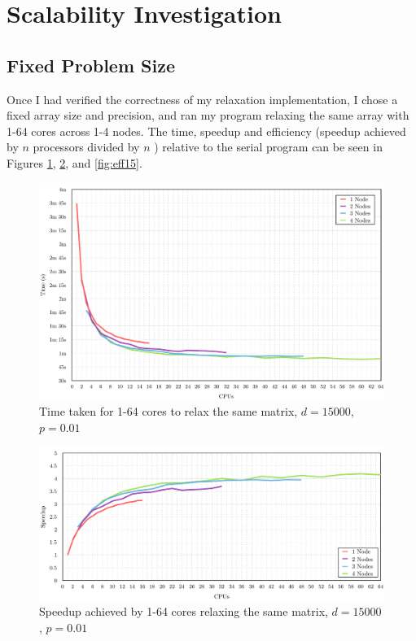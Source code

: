 \documentclass[12pt]{article}
\begin{document}
\section{Scalability Investigation}

\subsection{Fixed Problem Size}
Once I had verified the correctness of my relaxation implementation, I chose a fixed array size and precision, and ran my program relaxing the same array with 1-64 cores across 1-4 nodes.  The time, speedup and efficiency (speedup achieved by $n$ processors divided by $n$ \citep{speedup}) relative to the serial program can be seen in Figures \ref{fig:time15}, \ref{fig:sp15}, and \ref{fig:eff15}. 
\begin{figure}[!htbp]
        \centering\includegraphics[width=\textwidth]{img/basic-cpus-time.pdf}
        \caption{Time taken for 1-64 cores to relax the same matrix, $d=15000$, $p=0.01$}
        \label{fig:time15}
\end{figure}
\begin{figure}[!htbp]
        \centering\includegraphics[width=\textwidth]{img/15kspeedup.pdf}
        \caption{Speedup achieved by 1-64 cores relaxing the same matrix, $d=15000$, $p=0.01$}
        \label{fig:sp15}
\end{figure}
\end{document}
